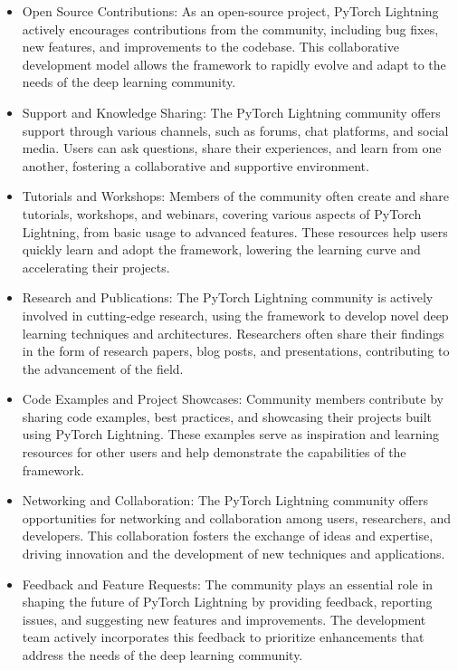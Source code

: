 \documentclass[12pt]{article}
\begin{document}
\begin{itemize}
    \item Open Source Contributions: As an open-source project, PyTorch Lightning actively encourages contributions from the community, including bug fixes, new features, and improvements to the codebase. This collaborative development model allows the framework to rapidly evolve and adapt to the needs of the deep learning community.
    \item Support and Knowledge Sharing: The PyTorch Lightning community offers support through various channels, such as forums, chat platforms, and social media. Users can ask questions, share their experiences, and learn from one another, fostering a collaborative and supportive environment.
    \item Tutorials and Workshops: Members of the community often create and share tutorials, workshops, and webinars, covering various aspects of PyTorch Lightning, from basic usage to advanced features. These resources help users quickly learn and adopt the framework, lowering the learning curve and accelerating their projects.
    \item Research and Publications: The PyTorch Lightning community is actively involved in cutting-edge research, using the framework to develop novel deep learning techniques and architectures. Researchers often share their findings in the form of research papers, blog posts, and presentations, contributing to the advancement of the field.
    \item Code Examples and Project Showcases: Community members contribute by sharing code examples, best practices, and showcasing their projects built using PyTorch Lightning. These examples serve as inspiration and learning resources for other users and help demonstrate the capabilities of the framework.
    \item Networking and Collaboration: The PyTorch Lightning community offers opportunities for networking and collaboration among users, researchers, and developers. This collaboration fosters the exchange of ideas and expertise, driving innovation and the development of new techniques and applications.
    \item Feedback and Feature Requests: The community plays an essential role in shaping the future of PyTorch Lightning by providing feedback, reporting issues, and suggesting new features and improvements. The development team actively incorporates this feedback to prioritize enhancements that address the needs of the deep learning community.
\end{itemize}
\end{document}
